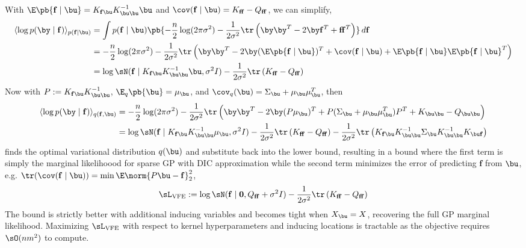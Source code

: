 \documentclass[11pt]{article}
\renewcommand\bf{\ensuremath{\mathbf{f}}}
\begin{document}
With $\E\pb{\bf\mid\bu} = K_{\bf\bu} K_{\bu\bu}^{-1}\bu$ and $\cov(\bf\mid\bu) = K_{\bf\bf} - Q_{\bf\bf}$, we can simplify,
\begin{align}
    \langle \log p(\by\mid\bf) \rangle_{p(\bf\mid\bu)}
        &= \int p(\bf\mid\bu) \pb{
            -\frac{n}{2} \log(2\pi \sigma^2) - \frac{1}{2\sigma^2} \tr\left( \by\by^T - 2\by\bf^T + \bf\bf^T \right)
        }\, d\bf \\
        &=  -\frac{n}{2} \log(2\pi \sigma^2) - \frac{1}{2\sigma^2} \tr\left( \by\by^T - 2\by (\E\pb{\bf\mid\bu})^T + \cov(\bf\mid\bu) + \E\pb{\bf\mid\bu} \E\pb{\bf\mid\bu}^T \right) \\
        &=  \log \sN(\bf \mid K_{\bf\bu}K_{\bu\bu}^{-1}\bu, \sigma^2I) - \frac{1}{2\sigma^2} \tr\left( K_{\bf\bf} - Q_{\bf\bf} \right)
\end{align}
Now with $P:= K_{\bf\bu}K_{\bu\bu}^{-1}$, $\E_q\pb{\bu} = \mu_{\bu}$, and $\cov_q(\bu) = \Sigma_{\bu} + \mu_{\bu}\mu_{\bu}^T$, then
\begin{align}
    \langle \log p(\by\mid \bf) \rangle_{q(\bf,\bu)}
        &=  -\frac{n}{2} \log(2\pi \sigma^2) - \frac{1}{2\sigma^2} \tr\left( \by\by^T - 2\by ( P \mu_{\bu})^T + P ( \Sigma_{\bu} + \mu_{\bu}\mu_{\bu}^T ) P^T + K_{\bu\bu} - Q_{\bu\bu} \right) \\
        &=  \log \sN(\bf \mid K_{\bf\bu}K_{\bu\bu}^{-1}\mu_{\bu}, \sigma^2I) - \frac{1}{2 \sigma^2} \tr\left( K_{\bf\bf} - Q_{\bf\bf} \right) - \frac{1}{2\sigma^2} \tr\left( K_{\bf\bu}K_{\bu\bu}^{-1} \Sigma_{\bu} K_{\bu\bu}^{-1} K_{\bu\bf} \right)
    \label{eq:sparse_gp_vfe_elbo_1}
\end{align}
\cite{titsiasVariationalLearningInducing2009} finds the optimal variational distribution $q(\bu)$ and substitute back into the lower bound, resulting in a bound where the first term is simply the marginal likelihoood for sparse GP with DIC approximation while the second term minimizes the error of predicting $\bf$ from $\bu$, e.g. $\tr(\cov(\bf\mid\bu)) = \min \E\norm{P \bu-\bf}_2^2$,
\begin{align}
    \sL_{\text{VFE}}
        :=  \log \sN(\bf \mid \mathbf{0},Q_{\bf\bf} +  \sigma^2I) - \frac{1}{2\sigma^2} \tr\left( K_{\bf\bf} - Q_{\bf\bf} \right)
    \label{eq:sparse_gp_vfe_collapsed_bound}
\end{align}
The bound is strictly better with additional inducing variables and becomes tight when $X_{\bu}=X$, recovering the full GP marginal likelihood. Maximizing $\sL_{\text{VFE}}$ with respect to kernel hyperparameters and inducing locations is tractable as the objective requires $\sO(nm^2)$ to compute.
\end{document}
